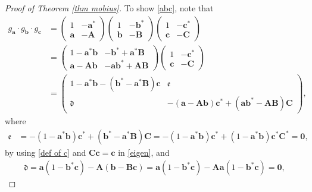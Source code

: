 \documentclass[a4paper,11pt]{amsart}
\numberwithin{equation}{section}
\begin{document}
\begin{proof}[Proof of Theorem \ref{thm mobius}]
 To show \eqref{abc}, note that
\begin{equation}\begin{aligned}\label{gagbgc}
 g_{\mathbf{a}}\cdot  g_{\mathbf{b}}\cdot  g_{\mathbf{c}}&=\begin{pmatrix} 1 & -\mathbf{a}^* \\ \mathbf{a} & -\mathbf{A} \end{pmatrix}\begin{pmatrix} 1 & -\mathbf{b}^* \\ \mathbf{b} & -\mathbf{B} \end{pmatrix}\begin{pmatrix} 1 & -\mathbf{c}^* \\ \mathbf{c} & -\mathbf{C} \end{pmatrix}\\
&=\begin{pmatrix} 1-\mathbf{a}^*\mathbf{b} & -\mathbf{b}^*+\mathbf{a}^*\mathbf{B} \\ \mathbf{a}-\mathbf{A}\mathbf{b} & -\mathbf{a}\mathbf{b}^*+\mathbf{A}\mathbf{B} \end{pmatrix}\begin{pmatrix} 1 & -\mathbf{c}^* \\ \mathbf{c} & -\mathbf{C} \end{pmatrix}\\
&=\begin{pmatrix} 1-\mathbf{a}^*\mathbf{b}-(\mathbf{b}^*-\mathbf{a}^*\mathbf{B})\mathbf{c} & \mathfrak{e} \\ \mathfrak{d} & -(\mathbf{a}-\mathbf{A}\mathbf{b})\mathbf{c}^*+(\mathbf{a}\mathbf{b}^*-\mathbf{A}\mathbf{B})\mathbf{C} \end{pmatrix},
\end{aligned}\end{equation}
where
\begin{equation*}\begin{aligned}
\mathfrak{e}&=-(1-\mathbf{a}^*\mathbf{b})\mathbf{c}^*+(\mathbf{b}^*-\mathbf{a}^*\mathbf{B})\mathbf{C}=-(1-\mathbf{a}^*\mathbf{b})\mathbf{c}^*+(1-\mathbf{a}^*\mathbf{b})\mathbf{c}^*\mathbf{C}^*=\mathbf{0},
\end{aligned}\end{equation*}
by using \eqref{def of c} and $\mathbf{C}\mathbf{c}=\mathbf{c}$ in \eqref{eigen}, and
\begin{equation*}\begin{aligned}
\mathfrak{d}=\mathbf{a}(1-\mathbf{b}^*\mathbf{c})-\mathbf{A}(\mathbf{b}-\mathbf{B}\mathbf{c})=\mathbf{a}(1-\mathbf{b}^*\mathbf{c})-\mathbf{A}\mathbf{a}(1-\mathbf{b}^*\mathbf{c})=\mathbf{0},

\end{aligned}
\end{equation*}
\end{proof}
\end{document}

